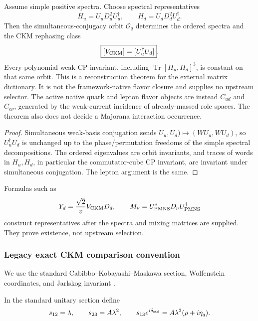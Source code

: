\documentclass[11pt,a4paper]{article}
\newcommand{\pvcite}[1]{\cite{#1}}
\begin{document}
\begin{theorem}
\label{p6:thm:v577-family-orbit-contraction}
Assume simple positive spectra.  Choose spectral representatives
\[
 H_u=U_uD_u^2U_u^\dagger,\qquad
 H_d=U_dD_d^2U_d^\dagger.
\]
Then the simultaneous-conjugacy orbit \(\mathcal O_q\) determines the ordered
spectra and the CKM rephasing class
\[
 \boxed{[V_{\rm CKM}]=[U_u^\dagger U_d]}.
\]
Every polynomial weak-CP invariant, including
\(\operatorname{Tr}[H_u,H_d]^3\), is constant on that same orbit.  This is a reconstruction theorem for the external matrix dictionary.  It is
not the framework-native flavor closure and supplies no upstream selector.
The active native quark and lepton flavor objects are instead \(C_{ud}\) and
\(C_{e\nu}\), generated by the weak-current incidence of already-massed role
spaces.  The theorem also does not decide a Majorana interaction occurrence.
\end{theorem}

\begin{proof}
Simultaneous weak-basis conjugation sends \(U_u,U_d)\mapsto(WU_u,WU_d)\), so
\(U_u^\dagger U_d\) is unchanged up to the phase/permutation freedoms of the
simple spectral decompositions.  The ordered eigenvalues are orbit invariants,
and traces of words in \(H_u,H_d\), in particular the commutator-cube CP
invariant, are invariant under simultaneous conjugation.  The lepton argument
is the same.
\end{proof}

\begin{corollary}
\label{p6:cor:flavor-realization-status}
Formulas such as
\[
Y_d=\frac{\sqrt2}{v}V_{\rm CKM}D_d,
\qquad
M_\nu=U_{\rm PMNS}^*D_\nu U_{\rm PMNS}^\dagger
\]
construct representatives after the spectra and mixing matrices are
supplied.  They prove existence, not upstream selection.
\end{corollary}

\subsubsection{Legacy exact CKM comparison convention}

We use the standard Cabibbo--Kobayashi--Maskawa section, Wolfenstein
coordinates, and Jarlskog invariant
\pvcite{Cabibbo1963,KobayashiMaskawa1973,Wolfenstein1983,Jarlskog1985}.

\begin{definition}
\label{p6:def:exact-ckm-coordinates}
In the standard unitary section define
\[
s_{12}=\lambda,\qquad
s_{23}=A\lambda^2,\qquad
s_{13}e^{i\delta_{\rm std}}
=A\lambda^3(\rho+i\eta_q).
\]
\end{definition}
\end{document}
